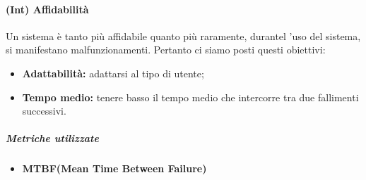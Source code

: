 \paragraph{\textbf{(Int) Affidabilità}}
	Un sistema è tanto più affidabile quanto più raramente, durantel 'uso del sistema, si manifestano malfunzionamenti. Pertanto ci siamo posti questi obiettivi:
	\begin{itemize}
	\item \textbf{Adattabilità:} adattarsi al tipo di utente;
	\item \textbf{Tempo medio:} tenere basso il tempo medio che intercorre tra due fallimenti successivi.
\end{itemize}
\vspace{0.8cm}
\subparagraph{Metriche utilizzate}
\begin{itemize}
	\item \textbf{MTBF(Mean Time Between Failure)}
\end{itemize}
\begin{table}[!htpb]
\end{table}
